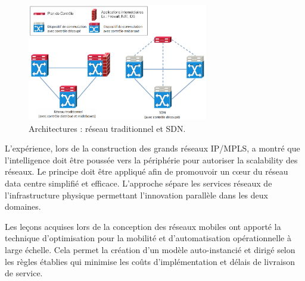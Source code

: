 \begin{figure}[h]
\begin{center}
\includegraphics[width=0.7\textwidth]{images/TraditionalVsSDN} 
\caption{Architectures : réseau traditionnel et SDN. \cite{SurveySDNArchi}} \label{TraditionalVsSDN}
\end{center}
\end{figure}


L'expérience, lors de la construction des grands réseaux IP/MPLS, a montré que l'intelligence doit être poussée vers la périphérie pour autoriser la \gls{scalability} des réseaux. Le principe doit être appliqué afin de promouvoir un cœur du réseau data centre simplifié et efficace. L'approche sépare les services réseaux de l'infrastructure physique permettant l'innovation parallèle dans les deux domaines.


Les leçons acquises lors de la conception des réseaux mobiles ont apporté la technique d'optimisation pour la mobilité et d'automatisation opérationnelle à large échelle. Cela permet la création d'un modèle auto-instancié et dirigé selon les règles établies qui minimise les coûts d'implémentation et délais de livraison de service.

